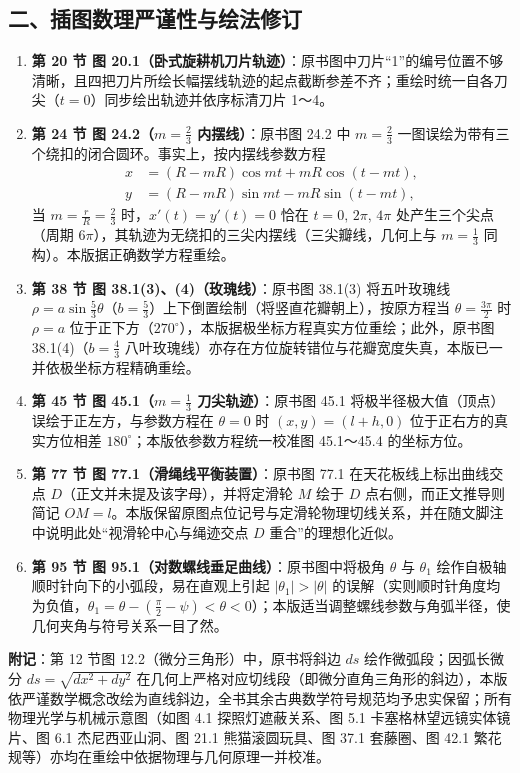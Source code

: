 {\vspace{-2mm}
\subsection*{二、插图数理严谨性与绘法修订}

\begin{enumerate}\setlength{\itemsep}{0pt}\setlength{\parsep}{0pt}\setlength{\topsep}{1.5pt}
  \item \textbf{第 20 节 图 20.1（卧式旋耕机刀片轨迹）}：原书图中刀片“1”的编号位置不够清晰，且四把刀片所绘长幅摆线轨迹的起点截断参差不齐；重绘时统一自各刀尖（$t=0$）同步绘出轨迹并依序标清刀片 1～4。
  \item \textbf{第 24 节 图 24.2（$m=\frac{2}{3}$ 内摆线）}：原书图 24.2 中 $m=\frac{2}{3}$ 一图误绘为带有三个绕扣的闭合圆环。事实上，按内摆线参数方程
  \[\begin{aligned}
    x &= (R - mR)\cos mt + mR\cos(t - mt), \\
    y &= (R - mR)\sin mt - mR\sin(t - mt),
  \end{aligned}\]
  当 $m=\frac{r}{R}=\frac{2}{3}$ 时，$x'(t)=y'(t)=0$ 恰在 $t=0,\, 2\pi,\, 4\pi$ 处产生三个尖点（周期 $6\pi$），其轨迹为无绕扣的三尖内摆线（三尖瓣线，几何上与 $m=\frac{1}{3}$ 同构）。本版据正确数学方程重绘。
  \item \textbf{第 38 节 图 38.1(3)、(4)（玫瑰线）}：原书图 38.1(3) 将五叶玫瑰线 $\rho = a\sin\frac{5}{3}\theta$（$b=\frac{5}{3}$）上下倒置绘制（将竖直花瓣朝上），按原方程当 $\theta = \frac{3\pi}{2}$ 时 $\rho = a$ 位于正下方（$270^\circ$），本版据极坐标方程真实方位重绘；此外，原书图 38.1(4)（$b=\frac{4}{3}$ 八叶玫瑰线）亦存在方位旋转错位与花瓣宽度失真，本版已一并依极坐标方程精确重绘。
  \item \textbf{第 45 节 图 45.1（$m=\frac{1}{3}$ 刀尖轨迹）}：原书图 45.1 将极半径极大值（顶点）误绘于正左方，与参数方程在 $\theta=0$ 时 $(x,y)=(l+h,0)$ 位于正右方的真实方位相差 $180^\circ$；本版依参数方程统一校准图 45.1～45.4 的坐标方位。
  \item \textbf{第 77 节 图 77.1（滑绳线平衡装置）}：原书图 77.1 在天花板线上标出曲线交点 $D$（正文并未提及该字母），并将定滑轮 $M$ 绘于 $D$ 点右侧，而正文推导则简记 $OM = l$。本版保留原图点位记号与定滑轮物理切线关系，并在随文脚注中说明此处“视滑轮中心与绳迹交点 $D$ 重合”的理想化近似。
  \item \textbf{第 95 节 图 95.1（对数螺线垂足曲线）}：原书图中将极角 $\theta$ 与 $\theta_1$ 绘作自极轴顺时针向下的小弧段，易在直观上引起 $|\theta_1|>|\theta|$ 的误解（实则顺时针角度均为负值，$\theta_1 = \theta - (\frac{\pi}{2}-\psi) < \theta < 0$）；本版适当调整螺线参数与角弧半径，使几何夹角与符号关系一目了然。
\end{enumerate}

\noindent\textbf{附记}：第 12 节图 12.2（微分三角形）中，原书将斜边 $ds$ 绘作微弧段；因弧长微分 $ds = \sqrt{dx^2+dy^2}$ 在几何上严格对应切线段（即微分直角三角形的斜边），本版依严谨数学概念改绘为直线斜边，全书其余古典数学符号规范均予忠实保留；所有物理光学与机械示意图（如图 4.1 探照灯遮蔽关系、图 5.1 卡塞格林望远镜实体镜片、图 6.1 杰尼西亚山洞、图 21.1 熊猫滚圆玩具、图 37.1 套藤圈、图 42.1 繁花规等）亦均在重绘中依据物理与几何原理一并校准。
}
